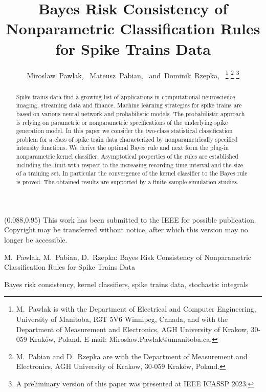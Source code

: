 \documentclass[lettersize,journal,onecolumn]{IEEEtran}
\theoremstyle{definition}
\newcommand{\copyrightstatement}{
	\begin{textblock}{0.828}(0.088,0.95)    %
		\noindent
		\footnotesize
		\textcopyright This work has been submitted to the IEEE for possible publication. 
		Copyright may be transferred without notice, after which this version may no 
		longer be accessible.
	\end{textblock}
}
\begin{document}
\copyrightstatement
	
\title{
	Bayes Risk Consistency of Nonparametric Classification Rules 
	for Spike Trains Data
}
\author{
	Miros\l{}aw~Pawlak,~
	Mateusz~Pabian,~
	and~Dominik~Rzepka,~%
	\thanks{
		M.~Pawlak is with the Department of Electrical and Computer Engineering, 
		University of Manitoba, R3T 5V6 Winnipeg, Canada,
		and with the Department of Measurement and Electronics, 
		AGH University of Krakow, 30-059 Kraków, Poland.
		E-mail: Miroslaw.Pawlak@umanitoba.ca.
	}%
	\thanks{
		M.~Pabian and D.~Rzepka are with the Department of Measurement and Electronics, 
		AGH University of Krakow, 30-059 Kraków, Poland.
	}%
	\thanks{
		A preliminary version of this paper was presented at IEEE ICASSP 2023.
	}%
}

{
	M.~Pawlak, M.~Pabian, D.~Rzepka: 
		Bayes Risk Consistency of Nonparametric Classification Rules 
		for Spike Trains Data
}

\maketitle

\begin{abstract}
	\noindent Spike trains data find a growing list of applications in computational 
	neuroscience,
	imaging, streaming data and finance. Machine learning strategies for spike
	trains are based on various neural network and probabilistic models. The probabilistic
	approach is relying on parametric or nonparametric specifications of the underlying spike
	generation model. In this paper we
	consider the two-class statistical classification problem for a class of spike train data
	characterized by nonparametrically specified intensity functions. We derive the optimal
	Bayes rule and next form the plug-in nonparametric kernel classifier. Asymptotical
	properties of the rules are established including the limit with respect to the
	increasing recording time interval and the size of a training set.
	In particular the convergence of the kernel classifier to the Bayes rule is proved.
	The obtained results are supported by a finite sample simulation studies.
\end{abstract}

\begin{IEEEkeywords}
	\noindent Bayes risk consistency, kernel classifiers, spike trains data, stochastic 
	integrals
\end{IEEEkeywords}
\end{document}
